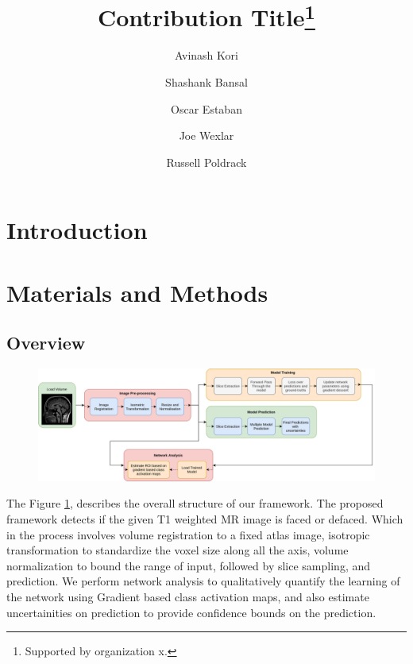 \documentclass[runningheads]{llncs}
\begin{document}
%
\title{Contribution Title\thanks{Supported by organization x.}}
%
%
\author{%
Avinash Kori\orcidID{} %
\and Shashank Bansal\orcidID{} %
\and Oscar Estaban \orcidID{}%
\and Joe Wexlar \orcidID{}%
\and Russell Poldrack\orcidID{}}
%
%
%
\maketitle              %
%
\begin{abstract}

\keywords{}
\end{abstract}
%
\section{Introduction}


\newpage
\section{Materials and Methods}

\subsection{Overview}
\begin{figure}
 \centering
 \label{fig:overview}
 \includegraphics[width=1\textwidth]{images/overview.png}
\end{figure}

The Figure \ref{fig:overview}, describes the overall structure of our framework. The proposed framework detects if the given T1 weighted MR image is faced or defaced. Which in the process involves volume registration to a fixed atlas image, isotropic transformation to standardize the voxel size along all the axis, volume normalization to bound the range of input, followed by slice sampling, and prediction. We perform network analysis to qualitatively quantify the learning of the network using Gradient based class activation maps, and also estimate uncertainities on prediction to provide confidence bounds on the prediction. 
\end{document}

